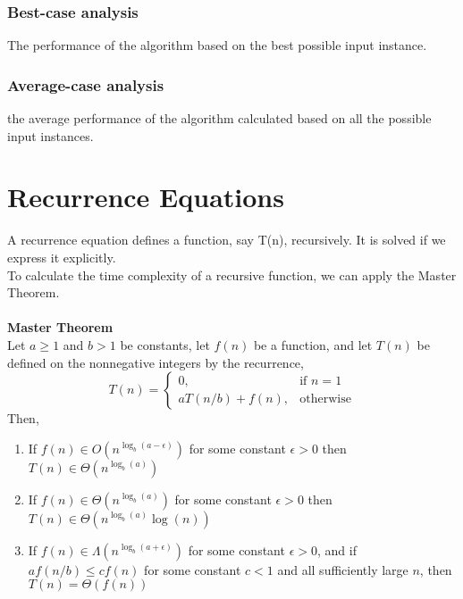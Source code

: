 \documentclass[a4paper]{article}
\begin{document}
\subsubsection{Best-case analysis}
The performance of the algorithm based on the best possible input instance.
\subsubsection{Average-case analysis}
the average performance of the algorithm calculated based on all the possible input instances.

\section{Recurrence Equations}
A recurrence equation defines a function, say T(n), recursively.
It is solved if we express it explicitly.\\
To calculate the time complexity of a recursive function, we can apply the Master Theorem.\\\\
\textbf{Master Theorem}\\
Let $a \ge 1$ and $b>1$ be constants, let $f(n)$ be a function, and let $T(n)$ be defined on the nonnegative integers by the recurrence, 
\[
	T(n)=
	\begin{cases}
		0, & \text{if } n=1\\
		aT(n/b) + f(n), & \text{otherwise}
	\end{cases}
\]
Then,
\begin{enumerate}
	\item If $f(n) \in O(n^{\log_b(a-\epsilon)})$ for some constant $\epsilon > 0$ then $T(n) \in \Theta(n^{\log_b(a)})$
	\item If $f(n) \in \Theta(n^{\log_b(a)})$ for some constant $\epsilon > 0$ then $T(n) \in \Theta(n^{\log_b(a)}\log(n))$
	\item If $f(n) \in \Lambda(n^{\log_b(a+\epsilon)})$ for some constant $\epsilon > 0$, and if $af(n/b)\le cf(n)$ for some constant $c<1$ and all sufficiently large $n$, then $T(n) = \Theta(f(n))$
\end{enumerate}
\end{document}

